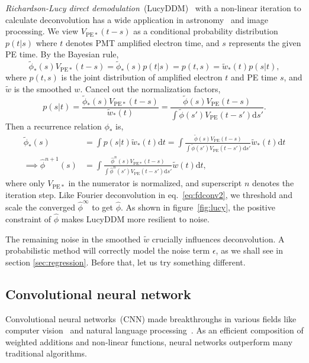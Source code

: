 \textit{Richardson-Lucy direct demodulation}~(LucyDDM)~\cite{lucy_iterative_1974} with a non-linear iteration to calculate deconvolution has a wide application in astronomy~\cite{li_richardson-lucy_2019} and image processing. We view $V_{\mathrm{PE}*}(t-s)$ as a conditional probability distribution $p(t|s)$ where $t$ denotes PMT amplified electron time, and $s$ represents the given PE time. By the Bayesian rule,
\begin{equation}
  \label{eq:lucy}
  \tilde{\phi}_*(s) V_{\mathrm{PE}*}(t-s) = \tilde{\phi}_*(s)p(t|s) = p(t,s) = \tilde{w}_*(t)p(s|t),
\end{equation}
where $p(t, s)$ is the joint distribution of amplified electron $t$ and PE time $s$, and $\tilde{w}$ is the smoothed $w$.  Cancel out the normalization factors,
\begin{equation}
  \label{eq:ptt}
  p(s|t) = \frac{\tilde{\phi}_*(s) V_{\mathrm{PE}*}(t-s)}{\tilde{w}_*(t)} = \frac{\tilde{\phi}(s) V_{\mathrm{PE}}(t-s)}{\int\tilde{\phi}(s') V_{\mathrm{PE}}(t-s')\mathrm{d}s'}.
\end{equation}
Then a recurrence relation $\phi_*$ is,
\begin{equation}
  \label{eq:iter}
  \begin{aligned}
    \tilde{\phi}_*(s) & = \int p(s|t) \tilde{w}_*(t)\mathrm{d}t = \int \frac{\tilde{\phi}(s) V_{\mathrm{PE}}(t-s)}{\int\tilde{\phi}(s') V_{\mathrm{PE}}(t-s')\mathrm{d}s'} \tilde{w}_*(t) \mathrm{d}t \\
    \implies \hat{\phi}^{n+1}(s) & = \int \frac{\hat{\phi}^n(s) V_{\mathrm{PE}*}(t-s)}{\int\hat{\phi}^n(s') V_{\mathrm{PE}}(t-s')\mathrm{d}s'} \tilde{w}(t) \mathrm{d}t,
  \end{aligned}
\end{equation}
where only $V_{\mathrm{PE}*}$ in the numerator is normalized, and superscript $n$ denotes the iteration step.
Like Fourier deconvolution in eq.~\eqref{eq:fdconv2}, we threshold and scale the converged $\hat{\phi}^\infty$ to get $\hat{\phi}$.  As shown in figure~\ref{fig:lucy}, the positive constraint of $\hat{\phi}$ makes LucyDDM more resilient to noise.

The remaining noise in the smoothed $\tilde{w}$ crucially influences deconvolution.  A probabilistic method will correctly model the noise term $\epsilon$, as we shall see in section \ref{sec:regression}.  Before that, let us try something different.

\subsection{Convolutional neural network}
\label{sec:cnn}
Convolutional neural networks~(CNN) made breakthroughs in various fields like computer vision~\cite{he_deep_2016} and natural language processing~\cite{vaswani_attention_2017}. As an efficient composition of weighted additions and non-linear functions, neural networks outperform many traditional algorithms.

